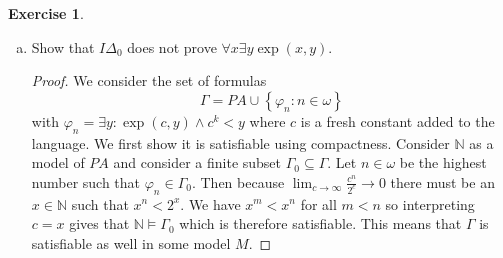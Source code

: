 \documentclass{article}
\newcommand{\N}{\mathbb{N}}
\newcommand{\setwith}[2]{\left\{#1:#2\right\}}
\theoremstyle{definition}
\newtheorem{question}{Exercise}
\begin{document}
\begin{question}
\begin{enumerate}[(a)]
\begin{proof}
                  Now we prove the principle of bounded induction for initial
                  segments. Suppose \(M\) is a model of \(PA\) and \(N\) is an
                  initial segment of \(M\) and bounded induction fails for a
                  formula \(\varphi(\bar{x},y)\). Then the antecedent of the
                  implication is true but the consequent is false: there is are
                  \(n,\bar{a}\in N\subseteq M\) such that
                  \(N\nVDash\varphi(\bar{a},n)\). Because \(\varphi\) is a
                  \(\Delta_{0}\) formula this means that
                  \(M\nVDash\varphi(\bar{a},n)\). By the least element principle
                  there is a least \(n'\leq n\) such that
                  \(M\nVDash\varphi(\bar{a},n')\) and
                  \(M\models\varphi(\bar{a},b)\) for all \(b<n'\), \(N\) is an
                  initial segment so \(n'\in N\) and therefore
                  \(N\nVDash\varphi(\bar{a},n')\) and
                  \(N\models\varphi(\bar{a},b)\) for all \(b<n'\). We assumed
                  the antecedent of the bounded induction schema was true so
                  this must mean that \(N\models\varphi(\bar{a},n')\) which is a
                  contradiction. Therefore \(N\) must satisfy the axiom schema
                  of bounded induction.
              \end{proof}

        \item Show that \(I\Delta_{0}\) does not prove \(\forall x\exists
              y\exp(x,y)\).

              \begin{proof}
                  We consider the set of formulas
                  \[
                      \Gamma=PA\cup\setwith{\varphi_{n}}{n\in\omega}
                  \]
                  with \(\varphi_{n}=\exists y:\exp(c,y)\wedge c^{k}<y\) where
                  \(c\) is a fresh constant added to the language. We first show
                  it is satisfiable using compactness. Consider \(\N\) as a
                  model of \(PA\) and consider a finite subset
                  \(\Gamma_{0}\subseteq\Gamma\). Let \(n\in\omega\) be the
                  highest number such that \(\varphi_{n}\in\Gamma_{0}\). Then
                  because \(\lim_{c\to\infty}\frac{c^{n}}{2^{c}}\to 0\) there
                  must be an \(x\in\N\) such that \(x^{n}<2^{x}\). We have
                  \(x^{m}<x^{n}\) for all \(m<n\) so interpreting \(c=x\) gives
                  that \(\N\models\Gamma_{0}\) which is therefore satisfiable.
                  This means that \(\Gamma\) is satisfiable as well in some
                  model \(M\).


\end{proof}
\end{enumerate}
\end{question}
\end{document}
